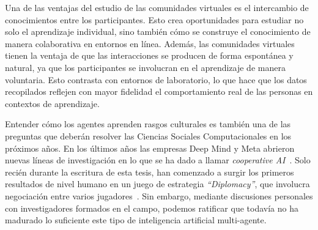 \documentclass[a4paper,11pt]{book}
\theoremstyle{definition}
\begin{document}

Una de las ventajas del estudio de las comunidades virtuales es el intercambio de conocimientos entre los participantes.
%
Esto crea oportunidades para estudiar no solo el aprendizaje individual, sino tambi\'en c\'omo se construye el conocimiento de manera colaborativa en entornos en l\'inea.
%
Adem\'as, las comunidades virtuales tienen la ventaja de que las interacciones se producen de forma espont\'anea y natural, ya que los participantes se involucran en el aprendizaje de manera voluntaria.
%
Esto contrasta con entornos de laboratorio, lo que hace que los datos recopilados reflejen con mayor fidelidad el comportamiento real de las personas en contextos de aprendizaje.


Entender c\'omo los agentes aprenden rasgos culturales es tambi\'en una de las preguntas que deber\'an resolver las Ciencias Sociales Computacionales en los pr\'oximos a\~nos.
%
En los \'ultimos a\~nos las empresas Deep Mind y Meta abrieron nuevas l\'ineas de investigaci\'on en lo que se ha dado a llamar \emph{cooperative AI}~\cite{dafoe2020-coopAI,dafoe2021-coopAIcomment}.
%
Solo reci\'en durante la escritura de esta tesis, han comenzado a surgir los primeros resultados de nivel humano en un juego de estrategia \emph{``Diplomacy''}, que involucra negociaci\'on entre varios jugadores~\cite{kramar2022-deepMindDiplomacy,meta2022-diplomacy}.
%
Sin embargo, mediante discusiones personales con investigadores formados en el campo, podemos ratificar que todav\'ia no ha madurado lo suficiente este tipo de inteligencia artificial multi-agente.

\end{document}
